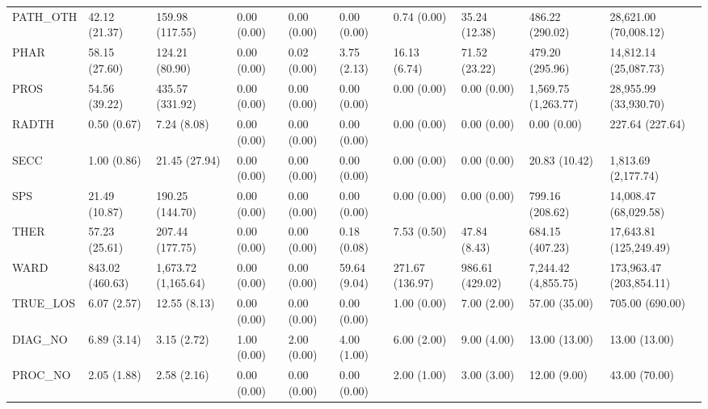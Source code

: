 \begin{tabular}{llllllllll}
PATH\_OTH &        42.12 (21.37) &      159.98 (117.55) &                0.00 (0.00) &            0.00 (0.00) &      0.00 (0.00) &        0.74 (0.00) &        35.24 (12.38) &        486.22 (290.02) &    28,621.00 (70,008.12) \\
PHAR     &        58.15 (27.60) &       124.21 (80.90) &                0.00 (0.00) &            0.02 (0.00) &      3.75 (2.13) &       16.13 (6.74) &        71.52 (23.22) &        479.20 (295.96) &    14,812.14 (25,087.73) \\
PROS     &        54.56 (39.22) &      435.57 (331.92) &                0.00 (0.00) &            0.00 (0.00) &      0.00 (0.00) &        0.00 (0.00) &          0.00 (0.00) &    1,569.75 (1,263.77) &    28,955.99 (33,930.70) \\
RADTH    &          0.50 (0.67) &          7.24 (8.08) &                0.00 (0.00) &            0.00 (0.00) &      0.00 (0.00) &        0.00 (0.00) &          0.00 (0.00) &            0.00 (0.00) &          227.64 (227.64) \\
SECC     &          1.00 (0.86) &        21.45 (27.94) &                0.00 (0.00) &            0.00 (0.00) &      0.00 (0.00) &        0.00 (0.00) &          0.00 (0.00) &          20.83 (10.42) &      1,813.69 (2,177.74) \\
SPS      &        21.49 (10.87) &      190.25 (144.70) &                0.00 (0.00) &            0.00 (0.00) &      0.00 (0.00) &        0.00 (0.00) &          0.00 (0.00) &        799.16 (208.62) &    14,008.47 (68,029.58) \\
THER     &        57.23 (25.61) &      207.44 (177.75) &                0.00 (0.00) &            0.00 (0.00) &      0.18 (0.08) &        7.53 (0.50) &         47.84 (8.43) &        684.15 (407.23) &   17,643.81 (125,249.49) \\
WARD     &      843.02 (460.63) &  1,673.72 (1,165.64) &                0.00 (0.00) &            0.00 (0.00) &     59.64 (9.04) &    271.67 (136.97) &      986.61 (429.02) &    7,244.42 (4,855.75) &  173,963.47 (203,854.11) \\
TRUE\_LOS &          6.07 (2.57) &         12.55 (8.13) &                0.00 (0.00) &            0.00 (0.00) &      0.00 (0.00) &        1.00 (0.00) &          7.00 (2.00) &          57.00 (35.00) &          705.00 (690.00) \\
DIAG\_NO  &          6.89 (3.14) &          3.15 (2.72) &                1.00 (0.00) &            2.00 (0.00) &      4.00 (1.00) &        6.00 (2.00) &          9.00 (4.00) &          13.00 (13.00) &            13.00 (13.00) \\
PROC\_NO  &          2.05 (1.88) &          2.58 (2.16) &                0.00 (0.00) &            0.00 (0.00) &      0.00 (0.00) &        2.00 (1.00) &          3.00 (3.00) &           12.00 (9.00) &            43.00 (70.00) \\
\bottomrule
\end{tabular}
